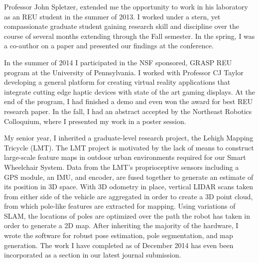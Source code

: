 Professor John Spletzer, extended me the opportunity to work in his laboratory
as an REU student in the summer of 2013. I worked under a stern, yet
compassionate graduate student gaining research skill and discipline over the
course of several months extending through the Fall semester. In the spring, I
was a co-author on a paper and presented our findings at the conference.

In the summer of 2014 I participated in the NSF sponsored, GRASP REU program at
the University of Pennsylvania. I worked with Professor CJ Taylor developing a
general platform for creating virtual reality applications that integrate
cutting edge haptic devices with state of the art gaming displays. At the end
of the program, I had finished a demo and even won the award for best REU
research paper. In the fall, I had an abstract accepted by the Northeast
Robotics Colloquium, where I presented my work in a poster session.

My senior year, I inherited a graduate-level research project, the Lehigh
Mapping Tricycle (LMT). The LMT project is motivated by the lack of means to
construct large-scale feature maps in outdoor urban environments required for
our Smart Wheelchair System.  Data from the LMT's proprioceptive sensors
including a GPS module, an IMU, and encoder, are fused together to generate an
estimate of its position in 3D space. With 3D odometry in place, vertical LIDAR
scans taken from either side of the vehicle are aggregated in order to create a
3D point cloud, from which pole-like features are extracted for mapping. Using
variations of SLAM, the locations of poles are optimized over the path the
robot has taken in order to generate a 2D map.  After inheriting the majority
of the hardware, I wrote the software for robust pose estimation, pole
segmentation, and map generation. The work I have completed as of December 2014
has even been incorporated as a section in our latest journal submission. 
